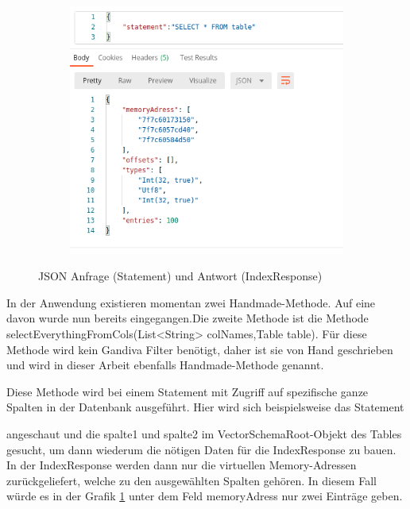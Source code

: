 \begin{figure}[h]
  \centering
  \begin{subfigure}[b]{0.5\textwidth}
    \includegraphics[width=1.0\linewidth]{img/json}
  \end{subfigure}
  \caption{JSON Anfrage (Statement) und Antwort (IndexResponse)}
  \label{graf_4}
\end{figure}

In der Anwendung existieren momentan zwei Handmade-Methode. Auf eine davon wurde nun bereits eingegangen.Die zweite Methode ist die Methode selectEverythingFromCols(List<String> colNames,Table table). Für diese Methode wird kein Gandiva Filter benötigt, daher ist sie von Hand geschrieben und wird in dieser Arbeit ebenfalls Handmade-Methode genannt.

Diese Methode wird bei einem Statement mit Zugriff auf spezifische ganze Spalten in der Datenbank ausgeführt. Hier wird sich beispielsweise das Statement   

\begin{center}
\end{center}

angeschaut und die spalte1 und spalte2 im VectorSchemaRoot-Objekt des Tables gesucht, um dann wiederum die nötigen Daten für die IndexResponse zu bauen.
In der IndexResponse werden dann nur die virtuellen Memory-Adressen zurückgeliefert, welche zu den ausgewählten Spalten gehören.
In diesem Fall würde es in der Grafik \ref{graf_4} unter dem Feld memoryAdress nur zwei Einträge geben.

